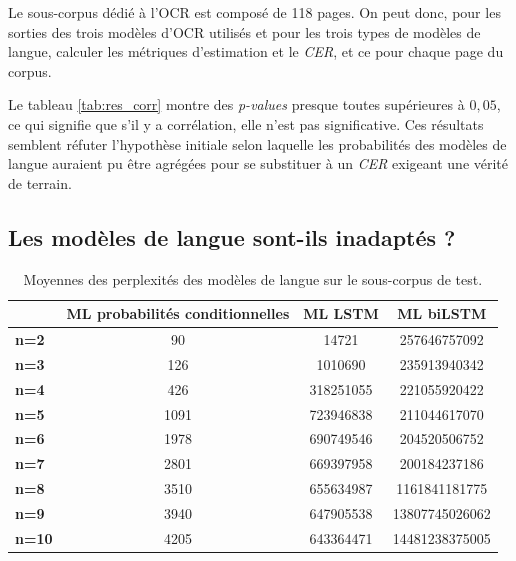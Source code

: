 \documentclass[10pt,twoside]{article}
\begin{document}
    Le sous-corpus dédié à l'OCR est composé de 118 pages.
    On peut donc, pour les sorties des trois modèles d'OCR utilisés et pour les trois types de modèles de langue, calculer 
    les métriques d'estimation et le \textit{CER}, et ce pour chaque page du corpus. 

    Le tableau \ref{tab:res_corr} montre des \textit{p-values} presque toutes supérieures à $0,05$, ce qui signifie que s'il y a
    corrélation, elle n'est pas significative. Ces résultats semblent réfuter l'hypothèse initiale selon laquelle les probabilités 
    des modèles de langue auraient pu être agrégées pour se substituer à un \textit{CER} exigeant une vérité de terrain. 

    \subsection{Les modèles de langue sont-ils inadaptés ?}

    \begin{table}[h]
    \begin{footnotesize}
    \begin{center}
    \begin{tabular}{|l|c|c|c|}
    \hline
                  & \textbf{ML probabilités conditionnelles} & \multicolumn{1}{r|}{\textbf{ML LSTM}} & \textbf{ML biLSTM} \\ \hline
    \textbf{n=2}  & 90                                       & 14721                                 & 257646757092       \\ \hline
    \textbf{n=3}  & 126                                      & 1010690                               & 235913940342       \\ \hline
    \textbf{n=4}  & 426                                      & 318251055                             & 221055920422       \\ \hline
    \textbf{n=5}  & 1091                                     & 723946838                             & 211044617070       \\ \hline
    \textbf{n=6}  & 1978                                     & 690749546                             & 204520506752       \\ \hline
    \textbf{n=7}  & 2801                                     & 669397958                             & 200184237186       \\ \hline
    \textbf{n=8}  & 3510                                     & 655634987                             & 1161841181775      \\ \hline
    \textbf{n=9}  & 3940                                     & 647905538                             & 13807745026062     \\ \hline
    \textbf{n=10} & 4205                                     & 643364471                             & 14481238375005     \\ \hline
    \end{tabular}\caption{Moyennes des perplexités des modèles de langue sur le sous-corpus de test.}\label{tab:perplex}
    \end{center}
    \end{footnotesize}
    \end{table}
\end{document}
